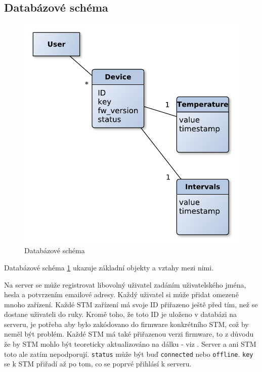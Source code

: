 \subsection{Databázové schéma}

\begin{figure}[tbh]\centering
\includegraphics[scale=0.6]{../diagrams/databazove_schema.pdf}
\caption{Databázové schéma}
\label{databazoveschema}
\end{figure}

Databázové schéma \ref{databazoveschema} ukazuje základní objekty a vztahy mezi nimi.

Na server se může registrovat libovolný uživatel zadáním uživatelského jména, hesla a potvrzením
emailové adresy.
Každý uživatel si může přidat omezeně mnoho zařízení.
Každé STM zařízení má svoje ID přiřazeno ještě před tím, než se dostane uživateli do ruky.
Kromě toho, že toto ID je uloženo v databázi na serveru, je potřeba aby bylo zakódovano do firmware
konkrétního STM, což by neměl být problém.
Každé STM má také přiřazenou verzi firmware, to z důvodu že by STM mohlo být teoreticky aktualizováno
na dálku - viz \cite{FW-update-over-ethernet}.
Server a ani STM toto ale zatím nepodporují.
\texttt{status} může být buď \texttt{connected} nebo \texttt{offline}.
\texttt{key} se k STM přiřadí až po tom, co se poprvé přihlásí k serveru.

